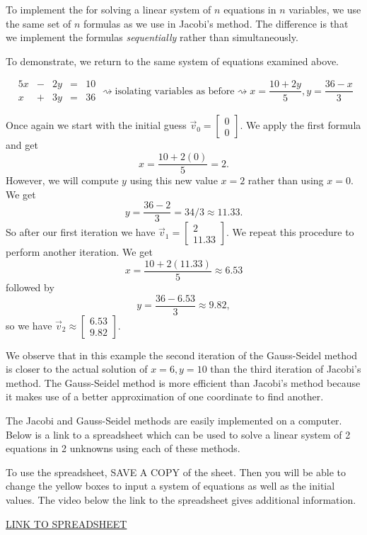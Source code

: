 \documentclass{ximera}
\begin{document}
To implement the  for solving a linear system of $n$ equations in $n$ variables, we use the same set of $n$ formulas as we use in Jacobi's method.  The difference is that we implement the formulas \emph{sequentially} rather than simultaneously.

To demonstrate, we return to the same system of equations examined above.

\begin{equation*}\begin{array}{ccccc}
      5x& -&2y&=&10\\
      x & +&3y&= &36 
    \end{array}
\rightsquigarrow\text{isolating variables as before}\rightsquigarrow
      x=\dfrac{10+2y}{5},
      y=\dfrac{36-x}{3}
\end{equation*}

Once again we start with the initial guess $\vec{v}_0 = \begin{bmatrix} 0\\0 \end{bmatrix}$.  We apply the first formula and get
$$x= \dfrac{10+2(0)}{5}=2.$$
However, we will compute $y$ using this new value $x=2$ rather than using $x=0$.  We get
$$y=\dfrac{36-2}{3} 
= 34/3 \approx 11.33.$$  So after our first iteration we have $\vec{v}_1 = \begin{bmatrix} 2\\11.33 \end{bmatrix}$.
We repeat this procedure to perform another iteration.  We get 
$$x= \dfrac{10+2(11.33)}{5}\approx 6.53$$
followed by
$$y=\dfrac{36-6.53}{3} \approx 9.82,$$
so we have $\vec{v}_2 \approx \begin{bmatrix} 6.53\\9.82 \end{bmatrix}$.

We observe that in this example the second iteration of the Gauss-Seidel method is closer to the actual solution of $x=6, y=10$ than the third iteration of Jacobi's method.  The Gauss-Seidel method is more efficient than Jacobi's method because it makes use of a better approximation of one coordinate to find another.

\begin{exploration}\label{exp:jacobi&gauss-seidel2x2spreadsheet}
The Jacobi and Gauss-Seidel methods are easily implemented on a computer.  Below is a link to a spreadsheet which can be used to solve a linear system of 2 equations in 2 unknowns using each of these methods.

To use the spreadsheet, SAVE A COPY of the sheet.  Then you will be able to change the yellow boxes to input a system of equations as well as the initial values.  The video below the link to the spreadsheet gives additional information.
    
\href{https://docs.google.com/spreadsheets/d/1CyQ9jvOL9WMxcphNu4QlM8ZQAkU2oHDQEbK2ORw7k-o/edit?usp=sharing}{LINK TO SPREADSHEET}

\end{exploration}
\end{document}
